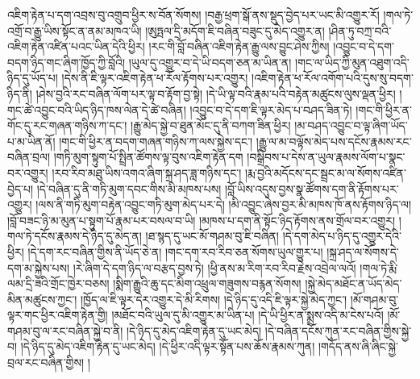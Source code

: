 འཇིག་རྟེན་པ་དག་འབྲས་བུ་འགྲུབ་ཕྱིར་ས་བོན་སོགས། །བརྒྱ་ཕྲག་སྒོ་ནས་སྡུད་བྱེད་པར་ཡང་མི་འགྱུར་རོ། །གལ་ཏེ་འགྲོ་བ་རྒྱུ་ཡིས་སྟོང་ན་ནམ་མཁའ་ཡི། །ཨུཏྤལ་དྲི་མདོག་ཇི་བཞིན་བཟུང་དུ་མེད་འགྱུར་ན། །ཤིན་ཏུ་བཀྲ་བའི་འཇིག་རྟེན་འཛིན་པའང་ཡིན་དེའི་ཕྱིར། །རང་གི་བློ་བཞིན་འཇིག་རྟེན་རྒྱུ་ལས་བྱུང་ཤེས་ཀྱིས། །འབྱུང་བ་དེ་དག་བདག་ཉིད་གང་ཞིག་ཁྱོད་ཀྱི་བློའི། །ཡུལ་དུ་འགྱུར་བ་དེ་ཡི་བདག་ཅན་མ་ཡིན་ན། །གང་ལ་ཡིད་ཀྱི་མུན་འཐུག་འདི་ཉིད་དུ་ཡོད་པ། །དེས་ནི་ཇི་ལྟར་འཇིག་རྟེན་ཕ་རོལ་རྟོགས་པར་འགྱུར། །འཇིག་རྟེན་ཕ་རོལ་འགོག་པའི་དུས་སུ་བདག་ཉིད་ནི། །ཤེས་བྱའི་རང་བཞིན་ལོག་པར་ལྟ་བ་རྟོག་བྱ་སྟེ། །དེ་ཡི་ལྟ་བའི་རྣམ་པའི་བརྟེན་མཚུངས་ལུས་ལྡན་ཕྱིར། །གང་ཚེ་འབྱུང་བའི་ཡིད་ཉིད་ཁས་ལེན་དེ་ཚེ་བཞིན། །འབྱུང་བ་དེ་དག་ཇི་ལྟར་མེད་པ་བཤད་ཟིན་ཏེ། །གང་གི་ཕྱིར་ན་གོང་དུ་རང་གཞན་གཉིས་ཀ་དང་། །རྒྱུ་མེད་སྐྱེ་བ་ཐུན་མོང་དུ་ནི་བཀག་ཟིན་ཕྱིར། །མ་བཤད་འབྱུང་བ་ལྟ་ཞིག་ཡོད་པ་མ་ཡིན་ནོ། །གང་གི་ཕྱིར་ན་བདག་གཞན་གཉིས་ཀ་ལས་སྐྱེས་དང་། །རྒྱུ་ལ་མ་བལྟོས་མེད་པས་དངོས་རྣམས་རང་བཞིན་བྲལ། །གཏི་མུག་སྟུག་པོ་སྤྲིན་ཚོགས་ལྟ་བུས་འཇིག་རྟེན་དག །བསྒྲིབས་པ་དེས་ན་ཡུལ་རྣམས་ལོག་པ་སྣང་བར་འགྱུར། །རབ་རིབ་མཐུ་ཡིས་འགའ་ཞིག་སྐྲ་ཤད་ཟླ་གཉིས་དང་། །རྨ་བྱའི་མདོངས་དང་སྦྲང་མ་ལ་སོགས་འཛིན་བྱེད་པ། །དེ་བཞིན་དུ་ནི་གཏི་མུག་དབང་གིས་མི་མཁས་པས། །བློ་ཡིས་འདུས་བྱས་སྣ་ཚོགས་དག་ནི་རྟོགས་པར་འགྱུར། །ལས་ནི་གཏི་མུག་བརྟེན་འབྱུང་གཏི་མུག་མེད་པར་དེ། །མི་འབྱུང་ཞེས་བྱར་མི་མཁས་ཁོ་ནས་རྟོགས་ཉིད་ལ། །བློ་བཟང་ཉི་མ་མུན་པ་སྟུག་པོ་རྣམ་པར་བསལ་བ་ཡི། །མཁས་པ་དག་ནི་སྟོང་ཉིད་རྟོགས་ནས་གྲོལ་བར་འགྱུར། །གལ་ཏེ་དངོས་རྣམས་དེ་ཉིད་དུ་མེད་ན། །ཐ་སྙད་དུ་ཡང་མོ་གཤམ་བུ་ཇི་བཞིན། །དེ་དག་མེད་པ་ཉིད་དུ་འགྱུར་དེའི་ཕྱིར། །དེ་དག་རང་བཞིན་གྱིས་ནི་ཡོད་ཅེ་ན། །གང་དག་རབ་རིབ་ཅན་སོགས་ཡུལ་གྱུར་པ། །སྐྲ་ཤད་ལ་སོགས་དེ་དག་མ་སྐྱེས་པས། །རེ་ཞིག་དེ་དག་ཉིད་ལ་བརྩད་བྱས་ཏེ། །ཕྱི་ནས་མ་རིག་རབ་རིབ་རྗེས་འབྲེལ་ལའོ། །གལ་ཏེ་རྨི་ལམ་དྲི་ཟའི་གྲོང་ཁྱེར་བཅས། །སྨིག་རྒྱུའི་ཆུ་དང་མིག་འཕྲུལ་གཟུགས་བརྙན་སོགས། །སྐྱེ་མེད་མཐོང་ན་ཡོད་མེད་མིན་མཚུངས་ཀྱང་། །ཁྱོད་ལ་ཇི་ལྟར་དེར་འགྱུར་དེ་མི་རིགས། །དེ་ཉིད་དུ་འདི་ཇི་ལྟར་སྐྱེ་མེད་ཀྱང་། །མོ་གཤམ་བུ་ལྟར་གང་ཕྱིར་འཇིག་རྟེན་གྱི། །མཐོང་བའི་ཡུལ་དུ་མི་འགྱུར་མ་ཡིན་པ། །དེ་ཡི་ཕྱིར་ན་སྨྲས་འདི་མ་ངེས་པའོ། །མོ་གཤམ་བུ་ལ་རང་བཞིན་སྐྱེ་བ་ནི། །དེ་ཉིད་དུ་མེད་འཇིག་རྟེན་དུ་ཡང་མེད། །དེ་བཞིན་དངོས་ཀུན་རང་བཞིན་གྱིས་སྐྱེ་བ། །དེ་ཉིད་དུ་མེད་འཇིག་རྟེན་དུ་ཡང་མེད། །དེ་ཕྱིར་འདི་ལྟར་སྟོན་པས་ཆོས་རྣམས་ཀུན། །གདོད་ནས་ཞི་ཞིང་སྐྱེ་བྲལ་རང་བཞིན་གྱིས། །
